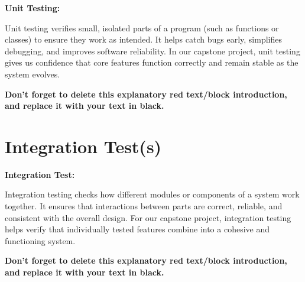\begin{tcolorbox}[      %
    boxrule=0pt,        %
    colback=white,      %
    coltext=red         %
]                       %
    \textbf{Unit Testing:}
    \vspace{15pt}
    
    Unit testing verifies small, isolated parts of a program (such as functions or classes) to ensure they work as intended. It helps catch bugs early, simplifies debugging, and improves software reliability. In our capstone project, unit testing gives us confidence that core features function correctly and remain stable as the system evolves.
    
    \vspace{15pt}       %
    \begin{center}      %
    \textbf{Don't forget to delete this explanatory red text/block introduction, and replace it with your text in black.}
    \end{center}        %
\end{tcolorbox}         %

\section{Integration Test(s)} %

\begin{tcolorbox}[      %
    boxrule=0pt,        %
    colback=white,      %
    coltext=red         %
]                       %
     \textbf{Integration Test:}
     \vspace{15pt}
     
     Integration testing checks how different modules or components of a system work together. It ensures that interactions between parts are correct, reliable, and consistent with the overall design. For our capstone project, integration testing helps verify that individually tested features combine into a cohesive and functioning system.
    
    \vspace{15pt}       %
    \begin{center}      %
    \textbf{Don't forget to delete this explanatory red text/block introduction, and replace it with your text in black.}
    \end{center}        %
\end{tcolorbox}         %